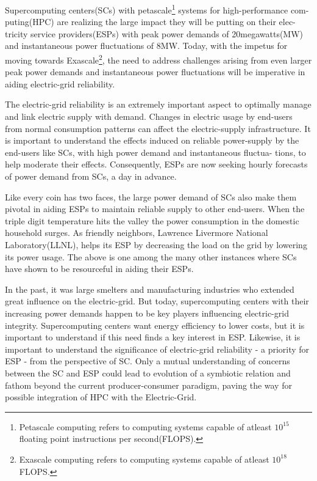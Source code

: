 Supercomputing centers(SCs) with petascale\footnote{Petascale computing refers to computing systems capable of atleast \(10^{15}\) floating point instructions per second(FLOPS).} systems for high-performance com- puting(HPC) are realizing the large impact they will be putting on their elec- tricity service providers(ESPs) with peak power demands of 20megawatts(MW) and instantaneous power fluctuations of 8MW. 
Today, with the impetus for moving towards Exascale\footnote{Exascale computing refers to computing systems capable of atleast \(10^{18}\)FLOPS.}, the need to address challenges arising from even larger peak power demands and instantaneous power fluctuations will be imperative in aiding electric-grid reliability.

The electric-grid reliability is an extremely important aspect to optimally manage and link electric supply with demand. Changes in electric usage by end-users from normal consumption patterns can affect the electric-supply infrastructure. 
It is important to understand the effects induced on reliable power-supply by the end-users like SCs, with high power demand and instantaneous fluctua- tions, to help moderate their effects. 
Consequently, ESPs are now seeking hourly forecasts of power demand from SCs, a day in advance.

Like every coin has two faces, the large power demand of SCs also make them pivotal in aiding ESPs to maintain reliable supply to other end-users. 
When the triple digit temperature hits the valley the power consumption in the domestic household surges. 
As friendly neighbors, Lawrence Livermore National Laboratory(LLNL), helps its ESP by decreasing the load on the grid by lowering its power usage. 
The above is one among the many other instances where SCs have shown to be resourceful in aiding their ESPs.

In the past, it was large smelters and manufacturing industries who extended great influence on the electric-grid. 
But today, supercomputing centers with their increasing power demands happen to be key players influencing electric-grid integrity.
Supercomputing centers want energy efficiency to lower costs, but it is important to understand if this need finds a key interest in ESP.
Likewise, it is important to understand the significance of electric-grid reliability - a priority for ESP - from the perspective of SC. 
Only a mutual understanding of concerns between the SC and ESP could lead to evolution of a symbiotic relation and fathom beyond the current producer-consumer paradigm, paving the way for possible integration of HPC with the Electric-Grid.

